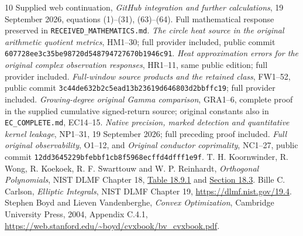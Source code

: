 \documentclass[11pt]{article}
\begin{document}
\begin{thebibliography}{10}
 Supplied web continuation, \emph{GitHub integration and further
calculations}, 19 September 2026, equations (1)--(31), (63)--(64).
Full mathematical response preserved in \texttt{RECEIVED\_MATHEMATICS.md}.
 \emph{The circle heat source in the original arithmetic quotient
metrics}, HM1--30; full provider included, public commit
\texttt{607728ee3c35be98720d548794727670b1946c91}.
 \emph{Heat approximation errors for the original complex
observation responses}, HR1--11, same public edition; full provider included.
 \emph{Full-window source products and the retained class},
FW1--52, public commit \texttt{3c44de632b2c5ead13b23619d646803d2bbffc19};
full provider included.
 \emph{Growing-degree original Gamma comparison}, GRA1--6,
complete proof in the supplied cumulative signed-return source;
original constants also in \texttt{EC\_COMPLETE.md}, EC14--15.
 \emph{Native precision, marked detection and quantitative kernel
leakage}, NP1--31, 19 September 2026; full preceding proof included.
 \emph{Full original observability}, O1--12, and
\emph{Original conductor coprimality}, NC1--27, public commit
\texttt{12dd3645229bfebbf1cb8f5968ecffd4dfff1e9f}.
 T. H. Koornwinder, R. Wong, R. Koekoek, R. F. Swarttouw
and W. P. Reinhardt, \emph{Orthogonal Polynomials}, NIST DLMF Chapter 18,
\href{https://dlmf.nist.gov/18.9.T1}{Table 18.9.1} and
\href{https://dlmf.nist.gov/18.3}{Section 18.3}.
 Bille C. Carlson, \emph{Elliptic Integrals}, NIST DLMF
Chapter 19, \url{https://dlmf.nist.gov/19.4}.
 Stephen Boyd and Lieven Vandenberghe,
\emph{Convex Optimization}, Cambridge University Press, 2004, Appendix C.4.1,
\url{https://web.stanford.edu/~boyd/cvxbook/bv_cvxbook.pdf}.
\end{thebibliography}
\end{document}
